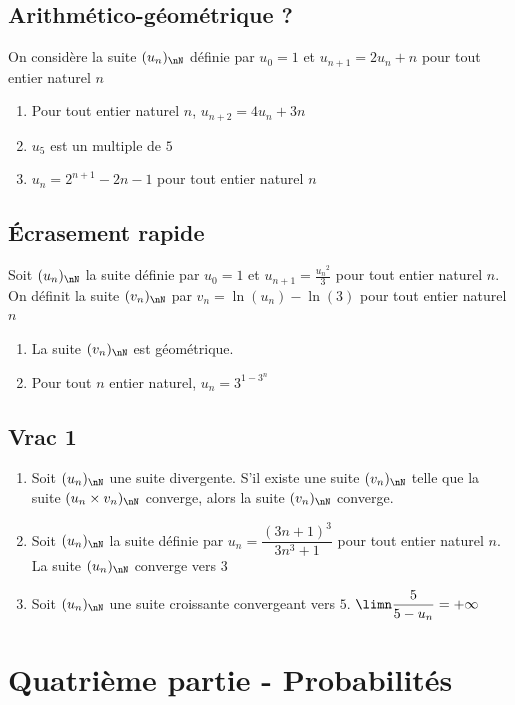 \documentclass[oneside,12pt]{article}
\begin{document}
\subsection{Arithmético-géométrique ?}
On considère la suite $(u_n)_{\nN}$ définie par $u_0=1$ et $u_{n+1}=2u_n+n$ pour tout entier naturel $n$
\begin{enumerate}
	\item Pour tout entier naturel $n$, $u_{n+2}=4u_n+3n$
	\item $u_5$ est un multiple de $5$
	\item $u_n=2^{n+1}-2n-1$ pour tout entier naturel $n$
\end{enumerate}



\subsection{Écrasement rapide}
Soit $(u_n)_{\nN}$ la suite définie par $u_0=1$ et $u_{n+1}=\frac{{u_n}^2}{3}$ pour tout entier naturel $n$. On définit la suite $(v_n)_{\nN}$ par $v_n=\ln(u_n)-\ln(3)$ pour tout entier naturel $n$
\begin{enumerate}
	\item La suite $(v_n)_{\nN}$ est géométrique.
	\item Pour tout $n$ entier naturel, $u_n=3^{1-3^n}$
\end{enumerate}



\subsection{Vrac 1}
\begin{enumerate}
	\item Soit $(u_n)_{\nN}$ une suite divergente. S'il existe une suite $(v_n)_{\nN}$ telle que la suite $(u_n\times v_n)_{\nN}$ converge, alors la suite $(v_n)_{\nN}$ converge.
	\item Soit $(u_n)_{\nN}$ la suite définie par $u_n=\dfrac{(3n+1)^3}{3n^3+1}$ pour tout entier naturel $n$. La suite $(u_n)_{\nN}$ converge vers $3$
	\item Soit $(u_n)_{\nN}$ une suite croissante convergeant vers $5$. $\limn \dfrac{5}{5-u_n}=+\infty$
\end{enumerate}



\section*{Quatrième partie - Probabilités}
\end{document}
